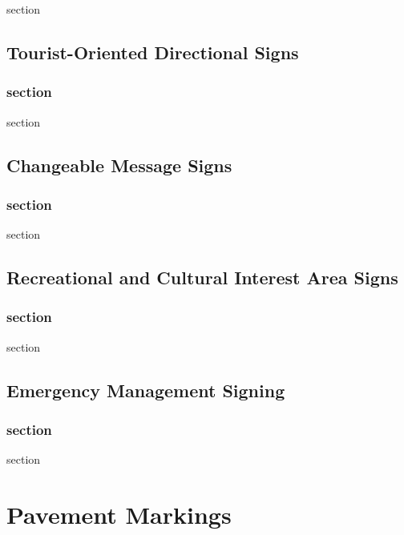 \documentclass[9pt]{memoir}
\newif\ifshowstatus
\newcommand{\status}[1]{\ifshowstatus\section*{Status}\par#1\par\fi}
\begin{document}
section

\chapter{Tourist-Oriented Directional Signs}

\status{Blank.}

\section{section}

section

\chapter{Changeable Message Signs}

\status{Blank.}

\section{section}

section

\chapter{Recreational and Cultural Interest Area Signs}

\status{Blank.}

\section{section}

section

\chapter{Emergency Management Signing}

\status{Blank.}

\section{section}

section

\part{Pavement Markings}

\status{Blank.}
\end{document}
